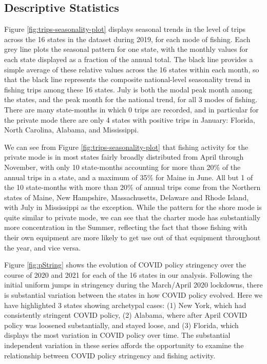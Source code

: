 \documentclass[12pt]{article}
\begin{document}
\subsection{Descriptive Statistics}



Figure \ref{fig:trips-seasonality-plot} displays seasonal trends in the
level of trips across the 16 states in the dataset during 2019, for each
mode of fishing. Each grey line plots the seasonal pattern for one
state, with the monthly values for each state displayed as a fraction of
the annual total. The black line provides a simple average of these
relative values across the 16 states within each month, so that the
black line represents the composite national-level seasonality trend in
fishing trips among these 16 states. July is both the modal peak month
among the states, and the peak month for the national trend, for all 3
modes of fishing. There are many state-months in which 0 trips are
recorded, and in particular for the private mode there are only 4 states
with positive trips in January: Florida, North Carolina, Alabama, and
Mississippi.

We can see from Figure \ref{fig:trips-seasonality-plot} that fishing
activity for the private mode is in most states fairly broadly
distributed from April through November, with only 10 state-months
accounting for more than 20\% of the annual trips in a state, and a
maximum of 35\% for Maine in June. All but 1 of the 10 state-months with
more than 20\% of annual trips come from the Northern states of Maine,
New Hampshire, Massachusetts, Delaware and Rhode Island, with July in
Mississippi as the exception. While the pattern for the shore mode is
quite similar to private mode, we can see that the charter mode has
substantially more concentration in the Summer, reflecting the fact that
those fishing with their own equipment are more likely to get use out of
that equipment throughout the year, and vice versa.



Figure \ref{fig:pString} shows the evolution of COVID policy stringency
over the course of 2020 and 2021 for each of the 16 states in our
analysis. Following the initial uniform jumps in stringency during the
March/April 2020 lockdowns, there is substantial variation between the
states in how COVID policy evolved. Here we have highlighted 3 states
showing archetypal cases: (1) New York, which had consistently stringent
COVID policy, (2) Alabama, where after April COVID policy was loosened
substantially, and stayed loose, and (3) Florida, which displays the
most variation in COVID policy over time. The substantial independent
variation in these series affords the opportunity to examine the
relationship between COVID policy stringency and fishing activity.
\end{document}
